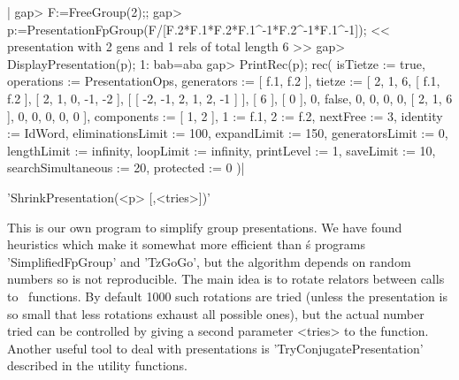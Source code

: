 |    gap> F:=FreeGroup(2);;
    gap> p:=PresentationFpGroup(F/[F.2*F.1*F.2*F.1^-1*F.2^-1*F.1^-1]);
    << presentation with 2 gens and 1 rels of total length 6 >>
    gap> DisplayPresentation(p);
    1: bab=aba
    gap> PrintRec(p);
    rec(
      isTietze           := true,
      operations         := PresentationOps,
      generators         := [ f.1, f.2 ],
      tietze             := [ 2, 1, 6, [ f.1, f.2 ], [ 2, 1, 0, -1, -2 ], 
      [ [ -2, -1, 2, 1, 2, -1 ] ], [ 6 ], [ 0 ], 0, false, 0, 0, 0, 0, 
      [ 2, 1, 6 ], 0, 0, 0, 0, 0 ],
      components         := [ 1, 2 ],
      1                  := f.1,
      2                  := f.2,
      nextFree           := 3,
      identity           := IdWord,
      eliminationsLimit  := 100,
      expandLimit        := 150,
      generatorsLimit    := 0,
      lengthLimit        := infinity,
      loopLimit          := infinity,
      printLevel         := 1,
      saveLimit          := 10,
      searchSimultaneous := 20,
      protected          := 0 )|


'ShrinkPresentation(<p> [,<tries>])'

This is our  own program to simplify group presentations.  We have found
heuristics which make it somewhat  more efficient than \GAP\' s programs
'SimplifiedFpGroup' and  'TzGoGo', but  the algorithm depends  on random
numbers so  is not  reproducible. The  main idea  is to  rotate relators
between calls  to \GAP\  functions. By default  1000 such  rotations are
tried (unless the  presentation is so small that  less rotations exhaust
all possible  ones), but the  actual number  tried can be  controlled by
giving a second  parameter <tries> to the function.  Another useful tool
to deal  with presentations  is 'TryConjugatePresentation'  described in
the utility functions.

